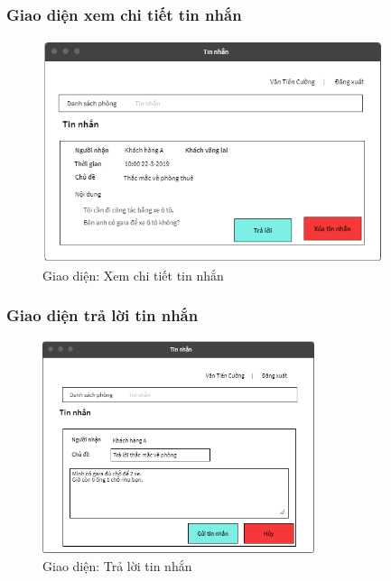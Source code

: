 \subsubsection{Giao diện xem chi tiết tin nhắn}
\begin{figure}[H]
	\centering
	\includegraphics[width=10cm]{parts/Cuong/images/chi-tiet-tin-nhan.png}
	\vspace{0.5cm}
	\caption{Giao diện: Xem chi tiết tin nhắn}
\end{figure}
\subsubsection{Giao diện trả lời tin nhắn}
\begin{figure}[H]
	\centering
	\includegraphics[width=8cm]{parts/Cuong/images/tra-loi-tin-nhan.png}
	\vspace{0.5cm}
	\caption{Giao diện: Trả lời tin nhắn}
\end{figure}